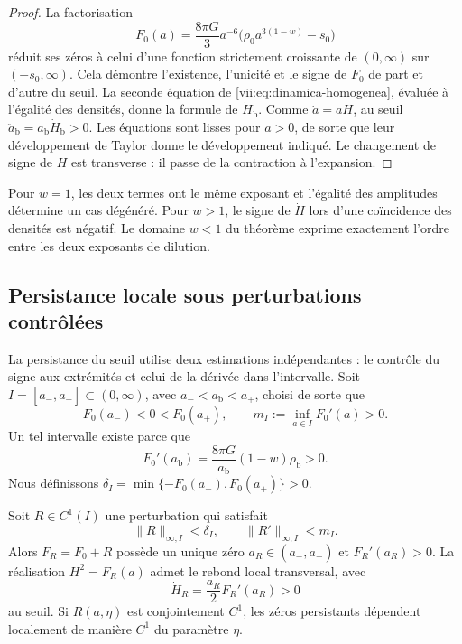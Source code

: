 \begin{proof}
La factorisation
\[
 F_0(a)=\frac{8\pi G}{3}a^{-6}
             \bigl(\rho_0a^{3(1-w)}-s_0\bigr)
\]
réduit ses zéros à celui d'une fonction strictement croissante de
\((0,\infty)\) sur \((-s_0,\infty)\). Cela démontre l'existence,
l'unicité et le signe de \(F_0\) de part et d'autre du seuil.
La seconde équation de \eqref{vii:eq:dinamica-homogenea}, évaluée
à l'égalité des densités, donne la formule de \(\dot H_{\mathrm b}\).
Comme \(\dot a=aH\), au seuil
\(\ddot a_{\mathrm b}=a_{\mathrm b}\dot H_{\mathrm b}>0\).
Les équations sont lisses pour \(a>0\), de sorte que leur développement de
Taylor donne le développement indiqué. Le changement de signe de \(H\) est
transverse : il passe de la contraction à l'expansion.
\end{proof}

Pour \(w=1\), les deux termes ont le même exposant et l'égalité des
amplitudes détermine un cas dégénéré. Pour \(w>1\), le signe de
\(\dot H\) lors d'une coïncidence des densités est négatif.
Le domaine \(w<1\) du théorème exprime exactement l'ordre entre les
deux exposants de dilution.

\subsection{Persistance locale sous perturbations contrôlées}
\label{vii:sec:persistencia}

La persistance du seuil utilise deux estimations indépendantes : le contrôle du signe aux extrémités et celui de la dérivée dans l'intervalle. Soit \(I=[a_-,a_+]\subset(0,\infty)\), avec \(a_-<a_{\mathrm b}<a_+\), choisi de sorte que
\[
 F_0(a_-)<0<F_0(a_+),\qquad
 m_I:=\inf_{a\in I}F_0'(a)>0.
\]
Un tel intervalle existe parce que
\[
 F_0'(a_{\mathrm b})
   =\frac{8\pi G}{a_{\mathrm b}}(1-w)\rho_{\mathrm b}>0.
\]
Nous définissons
\(\delta_I=\min\{-F_0(a_-),F_0(a_+)\}>0\).

\begingroup\fontsize{10}{11.7}\selectfont
\setlength{\parskip}{2pt}\setlength{\abovedisplayskip}{5pt}\setlength{\belowdisplayskip}{5pt}
\begin{theorem}
\label{vii:thm:persistencia}
Soit \(R\in C^1(I)\) une perturbation qui satisfait
\[
 \|R\|_{\infty,I}<\delta_I,\qquad
 \|R'\|_{\infty,I}<m_I.
\]
Alors \(F_R=F_0+R\) possède un unique zéro \(a_R\in(a_-,a_+)\) et \(F_R'(a_R)>0\). La réalisation \(H^2=F_R(a)\) admet le rebond local transversal, avec
\[
 \dot H_R=\frac{a_R}{2}F_R'(a_R)>0
\]
au seuil. Si \(R(a,\eta)\) est conjointement \(C^1\), les zéros
persistants dépendent localement de manière \(C^1\) du paramètre \(\eta\).
\end{theorem}

